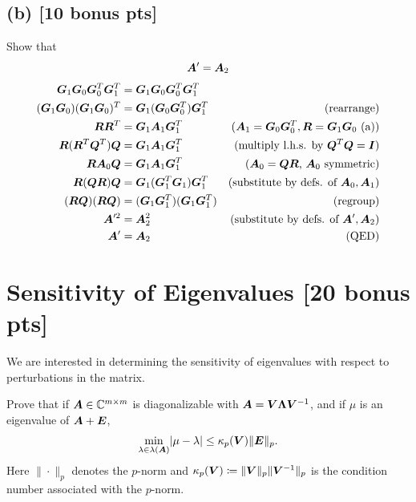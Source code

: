 \documentclass[twoside,10pt]{article}
\begin{document}
\subsection*{(b) [10 bonus pts]}
Show that
\begin{equation}
  \bm{A}' = \bm{A}_2
\end{equation}
\begin{align*}
  \bm{G}_1 \bm{G}_0\bm{G}_0^T \bm{G}_1^T &= \bm{G}_1\bm{G}_0 \bm{G}_0^T\bm{G}_1^T\\
  (\bm{G}_1 \bm{G}_0)(\bm{G}_1 \bm{G}_0)^T &= \bm{G}_1(\bm{G}_0 \bm{G}_0^T)\bm{G}_1^T&\text{(rearrange)}\\
  \bm{R}\bm{R}^T &= \bm{G}_1\bm{A}_1\bm{G}_1^T&\text{($\bm{A}_{1} = \bm{G}_0 \bm{G}_0^T, \bm{R} = \bm{G}_1\bm{G}_0$ (a))}\\
  \bm{R}(\bm{R}^T\bm{Q}^T)\bm{Q} &= \bm{G}_1\bm{A}_1\bm{G}_1^T&\text{(multiply l.h.s. by $\bm{Q}^T\bm{Q} = \bm{I}$)}\\
  \bm{R}\bm{A}_0\bm{Q} &= \bm{G}_1\bm{A}_1\bm{G}_1^T&\text{($\bm{A}_0 = \bm{Q}\bm{R}$, $\bm{A}_0$ symmetric)}\\
  \bm{R}(\bm{Q}\bm{R})\bm{Q} &= \bm{G}_1(\bm{G}_1^T\bm{G}_1)\bm{G}_1^T&\text{(substitute by defs. of $\bm{A}_0, \bm{A}_1$)}\\
  (\bm{R}\bm{Q})(\bm{R}\bm{Q}) &= (\bm{G}_1\bm{G}_1^T)(\bm{G}_1\bm{G}_1^T)&\text{(regroup)}\\
  \bm{A}'^2 &= \bm{A}_2^2&\text{(substitute by defs. of $\bm{A}', \bm{A}_2$)}\\
  \bm{A}' &= \bm{A}_2&\text{(QED)}
\end{align*}

\section{Sensitivity of Eigenvalues [20 bonus pts]}
We are interested in determining the sensitivity of eigenvalues with respect to perturbations in the matrix.

Prove that if $\bm{A} \in \mathbb{C}^{m \times m}$ is diagonalizable with $\bm{A} = \bm{V} \bm{\Lambda} \bm{V}^{-1}$, and if $\mu$ is an eigenvalue of $\bm{A} + \bm{E}$, 
\begin{equation*}
  \min \limits_{\lambda \in \lambda(\mtx{A})}  \left|\mu -\lambda \right| \leq \kappa_p(\mtx{V}) \|\mtx{E}\|_p.
\end{equation*}
Here $\|\cdot\|_p$ denotes the $p$-norm and $\kappa_p(\bm{V}) \coloneqq \|\bm{V}\|_p \|\bm{V}^{-1}\|_p$ is the condition number associated with the $p$-norm. 
\end{document}
